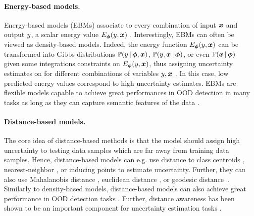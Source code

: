 \paragraph*{Energy-based models.} Energy-based models (EBMs) associate to every combination of input $\bm{x}$ and output $y$, a scalar energy value $E_{\bm{\phi}}(y, \bm{x})$ \cite{lecun2006tutorial}. Interestingly, EBMs can often be viewed as density-based models. Indeed, the energy function $E_{\bm{\phi}}(y, \bm{x})$ can be transformed into Gibbs distributions $\mathbb{P}(y \,|\, \bm{\phi}, \bm{x})$, $\mathbb{P}(y, \bm{x} \,|\, \bm{\phi})$, or even $\mathbb{P}(\bm{x} \,|\, \bm{\phi})$ given some integrations constraints on $E_{\bm{\phi}}(y, \bm{x})$, thus assigning uncertainty estimates on for different combinations of variables $y, \bm{x}$ \cite{energy_based_classifier}. In this case, low predicted energy values correspond to high uncertainty estimates. EBMs are flexible models capable to achieve great performances in OOD detection in many tasks \citep{energy-ood,wang2021ebm} as long as they can capture semantic features of the data \cite{ood_ebm}.

\paragraph*{Distance-based models.} The core idea of distance-based methods is that the model should assign high uncertainty to testing data samples which are far away from training data samples. Hence, distance-based models can e.g. use distance to class centroids \cite{mohseni2020self}, nearest-neighbor \cite{sun2022knnood}, or inducing points \cite{due} to estimate uncertainty. Further, they can also use Mahalanobis distance \cite{mohseni2020self}, euclidean distance \cite{huang2021feature}, or geodesic distance \cite{gomes2022igeood}. Similarly to density-based models, distance-based models can also achieve great performance in OOD detection tasks \cite{ood-detection-survey}. Further, distance awareness has been shown to be an important component for uncertainty estimation tasks \cite{uncertainty-distance-awareness,due}.

